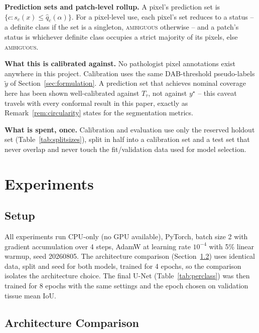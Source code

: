 \documentclass[conference]{IEEEtran}
\begin{document}
\textbf{Prediction sets and patch-level rollup.} A pixel's prediction set
is $\{c : s_c(x) \le \hat q_c(\alpha)\}$. For a pixel-level use, each pixel's set reduces to a status
-- a definite class if the set is a singleton, \textsc{ambiguous}
otherwise -- and a patch's status is whichever definite class occupies a
strict majority of its pixels, else \textsc{ambiguous}.

\textbf{What this is calibrated against.} No pathologist pixel annotations
exist anywhere in this project. Calibration uses the same DAB-threshold
pseudo-labels $\tilde y$ of Section~\ref{sec:formulation}. A prediction set
that achieves nominal coverage here has been shown well-calibrated against
$T_\tau$, not against $y^\star$ -- this caveat travels with every conformal
result in this paper, exactly as Remark~\ref{rem:circularity} states for
the segmentation metrics.

\textbf{What is spent, once.} Calibration and evaluation use only the
reserved holdout set (Table~\ref{tab:splitsizes}), split in half into a
calibration set and a test set that never overlap and never touch the
fit/validation data used for model selection.

\section{Experiments}
\label{sec:experiments}

\subsection{Setup}

All experiments run CPU-only (no GPU available), PyTorch, batch size 2 with
gradient accumulation over 4 steps, AdamW at learning rate $10^{-4}$ with
5\% linear warmup, seed 20260805. The architecture comparison
(Section~\ref{sec:archresults}) uses identical data, split and seed for
both models, trained for 4 epochs, so the comparison isolates the architecture choice. The final U-Net (Table~\ref{tab:perclass}) was then trained for 8 epochs with the same settings and the epoch chosen on validation tissue mean IoU.

\subsection{Architecture Comparison}
\label{sec:archresults}
\end{document}
